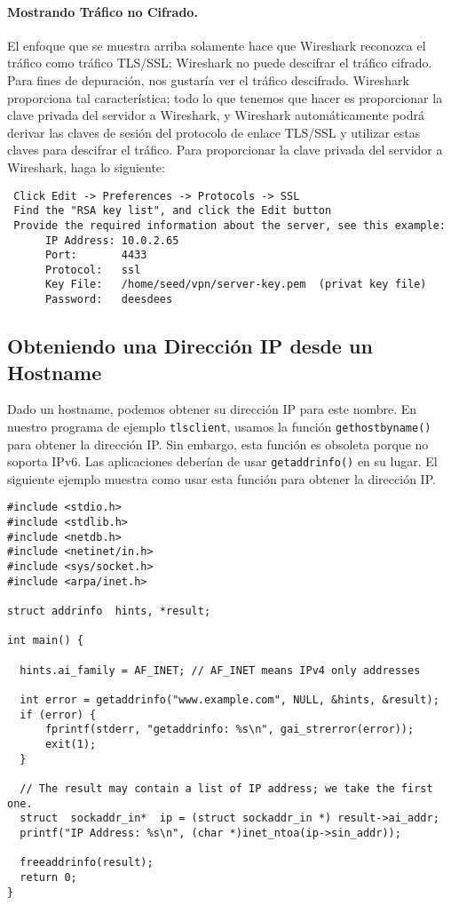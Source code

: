 \paragraph{Mostrando Tráfico no Cifrado.} El enfoque que se muestra arriba solamente
hace que Wireshark reconozca el tráfico como tráfico TLS/SSL; Wireshark no puede
descifrar el tráfico cifrado. Para fines de depuración, nos gustaría ver el tráfico descifrado.
Wireshark proporciona tal característica; todo lo que tenemos que hacer es proporcionar la clave privada del servidor a Wireshark, y Wireshark automáticamente podrá derivar las claves de sesión del protocolo de enlace TLS/SSL y utilizar estas claves para descifrar el tráfico. 
Para proporcionar la clave privada del servidor a Wireshark, haga lo siguiente:

\begin{lstlisting}
 Click Edit -> Preferences -> Protocols -> SSL 
 Find the "RSA key list", and click the Edit button
 Provide the required information about the server, see this example:
      IP Address: 10.0.2.65
      Port:       4433
      Protocol:   ssl
      Key File:   /home/seed/vpn/server-key.pem  (privat key file)
      Password:   deesdees
\end{lstlisting}


\subsection{Obteniendo una Dirección IP desde un Hostname}
\label{vpn:subsec:hostnametoip}

Dado un hostname, podemos obtener su dirección IP para este nombre.
En nuestro programa de ejemplo \texttt{tlsclient}, usamos la función \texttt{gethostbyname()} para obtener la dirección IP. Sin embargo, esta función es obsoleta porque no soporta IPv6.
Las aplicaciones deberían de usar \texttt{getaddrinfo()} en su lugar. El siguiente ejemplo muestra como usar esta función para obtener la dirección IP.

\begin{lstlisting}
#include <stdio.h>
#include <stdlib.h>
#include <netdb.h>
#include <netinet/in.h>
#include <sys/socket.h>
#include <arpa/inet.h>

struct addrinfo  hints, *result;

int main() {

  hints.ai_family = AF_INET; // AF_INET means IPv4 only addresses

  int error = getaddrinfo("www.example.com", NULL, &hints, &result);
  if (error) {
      fprintf(stderr, "getaddrinfo: %s\n", gai_strerror(error));
      exit(1);
  }

  // The result may contain a list of IP address; we take the first one.
  struct  sockaddr_in*  ip = (struct sockaddr_in *) result->ai_addr;
  printf("IP Address: %s\n", (char *)inet_ntoa(ip->sin_addr));

  freeaddrinfo(result);
  return 0;
}
\end{lstlisting}
 


